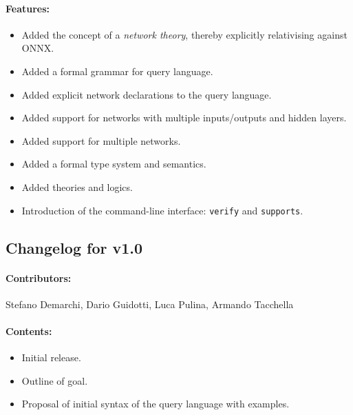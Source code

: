 \noindent \paragraph{Features:}
\begin{itemize}
\item Added the concept of a \emph{network theory}, thereby explicitly relativising \vnnlib{} against ONNX.
\item Added a formal grammar for query language.
\item Added explicit network declarations to the query language.
\item Added support for networks with multiple inputs/outputs and hidden layers.
\item Added support for multiple networks.
\item Added a formal type system and semantics.
\item Added theories and logics.
\item Introduction of the command-line interface: \texttt{verify} and \texttt{supports}.
\end{itemize}

\subsection*{Changelog for v1.0}

\paragraph{Contributors:} Stefano Demarchi, Dario Guidotti, Luca Pulina, Armando Tacchella

\paragraph{Contents:}
\begin{itemize}
\item Initial release.
\item Outline of goal.
\item Proposal of initial syntax of the query language with examples.
\end{itemize}
